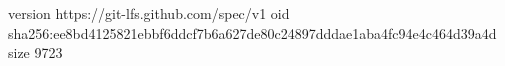 version https://git-lfs.github.com/spec/v1
oid sha256:ee8bd4125821ebbf6ddcf7b6a627de80c24897dddae1aba4fc94e4c464d39a4d
size 9723
